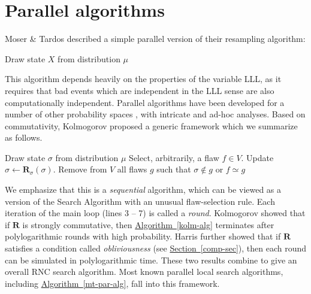 \documentclass[11pt]{article}
\newcommand{\expref}[2]{\texorpdfstring{\hyperref[#2]{#1~\ref{#2}}}{#1~\ref{#2}}}
\begin{document}
\section{Parallel algorithms} 
\label{sec:parallel}
Moser \& Tardos \cite{MT} described a simple parallel version of their resampling algorithm:
\begin{algorithm}[H]
\centering
\begin{algorithmic}[1]
\State Draw state $X$ from distribution $\mu$
\EndWhile
\end{algorithmic}
\caption{Parallel Moser-Tardos algorithm}
\label{mt-par-alg}
\end{algorithm}

This algorithm depends heavily on the properties of the variable LLL, as it requires that bad events which are independent in the LLL sense are also computationally independent.  Parallel algorithms have been developed for a number of other probability spaces \cite{PermHarris, LLLLBeyond}, with intricate and ad-hoc analyses. Based on commutativity, Kolmogorov \cite{Kolmofocs} proposed a generic framework which we summarize as follows. %
\begin{algorithm}[H]
\centering
\begin{algorithmic}[1]
\State Draw state $\sigma$ from distribution $\mu$
\State Select, arbitrarily, a flaw $f \in V$.
\State Update $\sigma \leftarrow \mathbf R_{\sigma} (\sigma)$.
\State Remove from $V$ all flaws $g$ such that $\sigma \notin g$ or $f \simeq g$
\EndWhile
\EndWhile
\end{algorithmic}
\caption{Generic parallel resampling framework}
\label{kolm-alg}
\end{algorithm}

We emphasize that this is a \emph{sequential} algorithm, which can be viewed as a version of the Search Algorithm with an unusual flaw-selection rule. Each iteration of the main loop (lines 3 -- 7) is called a \emph{round}.  Kolmogorov showed that if $\mathbf R$ is strongly commutative, then \expref{Algorithm}{kolm-alg} terminates after polylogarithmic rounds with high probability. Harris \cite{ParallelHarris} further showed that if $\mathbf R$ satisfies a %
condition  %
called \emph{obliviousness} (see \expref{Section}{comp-sec}), then each round can be simulated in polylogarithmic time. These two results combine to give an overall RNC search algorithm.   Most known parallel local search algorithms, including  \expref{Algorithm}{mt-par-alg}, fall into this framework. 
\end{document}
